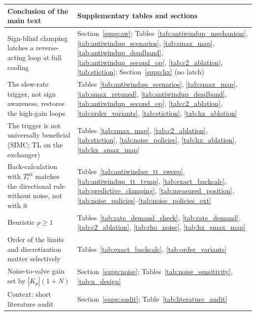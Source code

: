 \documentclass[11pt]{article}
\begin{document}
{\centering\footnotesize
\begin{tabular}{p{7.6cm}p{7.4cm}}
\toprule
Conclusion of the main text & Supplementary tables and sections \\
\midrule
Sign-blind clamping latches a reverse-acting loop at full cooling & Section~\ref{supp:aw}; Tables~\ref{tab:antiwindup_mechanism}, \ref{tab:antiwindup_scenarios}, \ref{tab:smax_map}, \ref{tab:antiwindup_deadband}, \ref{tab:antiwindup_second_op}, \ref{tab:c2_ablation}, \ref{tab:stiction}; Section~\ref{supp:hx} (no latch) \\
The slew-rate trigger, not sign awareness, restores the high-gain loops & Tables~\ref{tab:antiwindup_scenarios}, \ref{tab:smax_map}, \ref{tab:smax_retuned}, \ref{tab:antiwindup_deadband}, \ref{tab:antiwindup_second_op}, \ref{tab:c2_ablation}, \ref{tab:order_variants}, \ref{tab:stiction}, \ref{tab:hx_ablation} \\
The trigger is not universally beneficial (SIMC; TL on the exchanger) & Tables~\ref{tab:smax_map}, \ref{tab:c2_ablation}, \ref{tab:stiction}, \ref{tab:noise_policies}, \ref{tab:hx_ablation}, \ref{tab:hx_smax_map} \\
Back-calculation with $T_t^{\mathrm{sel}}$ matches the directional rule without noise, not with it & Tables~\ref{tab:antiwindup_tt_sweep}, \ref{tab:antiwindup_tt_tvmp}, \ref{tab:exact_backcalc}, \ref{tab:predictive_clamping}, \ref{tab:measured_position}, \ref{tab:noise_policies}--\ref{tab:noise_policies_ext} \\
Heuristic $\rho \ge 1$ & Tables~\ref{tab:rate_demand_check}, \ref{tab:rate_demand}, \ref{tab:c2_ablation}, \ref{tab:rho_noise}, \ref{tab:hx_smax_map} \\
Order of the limits and discretization matter selectively & Tables~\ref{tab:exact_backcalc}, \ref{tab:order_variants} \\
Noise-to-valve gain set by $|K_p|(1+N)$ & Section~\ref{supp:noise}; Tables~\ref{tab:noise_sensitivity}, \ref{tab:n_design} \\
Context: short literature audit & Section~\ref{supp:audit}; Table~\ref{tab:literature_audit} \\
\bottomrule
\end{tabular}\par}
\end{document}
